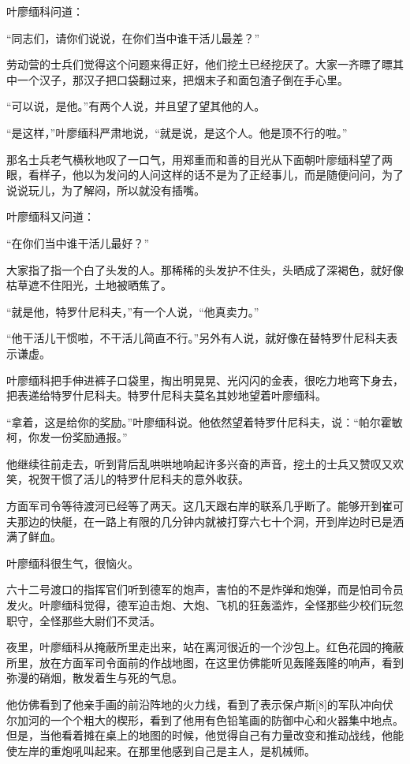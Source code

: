 叶廖缅科问道：

“同志们，请你们说说，在你们当中谁干活儿最差？”

劳动营的士兵们觉得这个问题来得正好，他们挖土已经挖厌了。大家一齐瞟了瞟其中一个汉子，那汉子把口袋翻过来，把烟末子和面包渣子倒在手心里。

“可以说，是他。”有两个人说，并且望了望其他的人。

“是这样，”叶廖缅科严肃地说，“就是说，是这个人。他是顶不行的啦。”

那名士兵老气横秋地叹了一口气，用郑重而和善的目光从下面朝叶廖缅科望了两眼，看样子，他以为发问的人问这样的话不是为了正经事儿，而是随便问问，为了说说玩儿，为了解闷，所以就没有插嘴。

叶廖缅科又问道：

“在你们当中谁干活儿最好？”

大家指了指一个白了头发的人。那稀稀的头发护不住头，头晒成了深褐色，就好像枯草遮不住阳光，土地被晒焦了。

“就是他，特罗什尼科夫，”有一个人说，“他真卖力。”

“他干活儿干惯啦，不干活儿简直不行。”另外有人说，就好像在替特罗什尼科夫表示谦虚。

叶廖缅科把手伸进裤子口袋里，掏出明晃晃、光闪闪的金表，很吃力地弯下身去，把表递给特罗什尼科夫。特罗什尼科夫莫名其妙地望着叶廖缅科。

“拿着，这是给你的奖励。”叶廖缅科说。他依然望着特罗什尼科夫，说：“帕尔霍敏柯，你发一份奖励通报。”

他继续往前走去，听到背后乱哄哄地响起许多兴奋的声音，挖土的士兵又赞叹又欢笑，祝贺干惯了活儿的特罗什尼科夫的意外收获。

方面军司令等待渡河已经等了两天。这几天跟右岸的联系几乎断了。能够开到崔可夫那边的快艇，在一路上有限的几分钟内就被打穿六七十个洞，开到岸边时已是洒满了鲜血。

叶廖缅科很生气，很恼火。

六十二号渡口的指挥官们听到德军的炮声，害怕的不是炸弹和炮弹，而是怕司令员发火。叶廖缅科觉得，德军迫击炮、大炮、飞机的狂轰滥炸，全怪那些少校们玩忽职守，全怪那些大尉们不灵活。

夜里，叶廖缅科从掩蔽所里走出来，站在离河很近的一个沙包上。红色花园的掩蔽所里，放在方面军司令面前的作战地图，在这里仿佛能听见轰隆轰隆的响声，看到弥漫的硝烟，散发着生与死的气息。

他仿佛看到了他亲手画的前沿阵地的火力线，看到了表示保卢斯[8]的军队冲向伏尔加河的一个个粗大的楔形，看到了他用有色铅笔画的防御中心和火器集中地点。但是，当他看着摊在桌上的地图的时候，他觉得自己有力量改变和推动战线，他能使左岸的重炮吼叫起来。在那里他感到自己是主人，是机械师。

